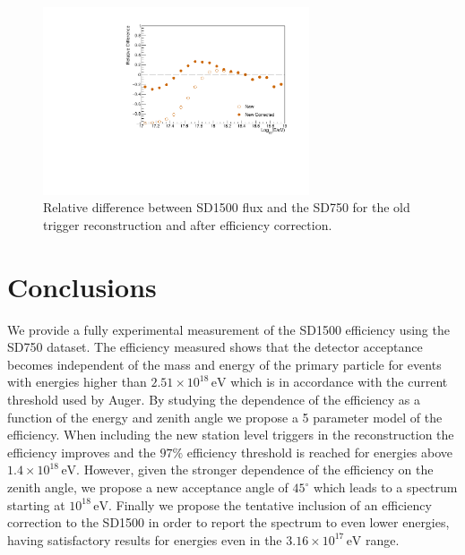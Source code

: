 \documentclass[12pt,a4paper]{article}
\newcommand{\eV}{\, \mathrm{eV}}
\begin{document}
\begin{figure}[H]
    \begin{center}
        \includegraphics[width=0.7\textwidth]{plots/NewDifference.pdf}
        \caption{Relative difference between SD1500 flux and the SD750 for the old trigger reconstruction and after efficiency correction.
        \label{fig:difference}}
        \vspace{-0.5cm}
    \end{center}
\end{figure} 

\section*{Conclusions}

We provide a fully experimental measurement of the SD1500 efficiency using the SD750 dataset. The efficiency measured shows that the detector acceptance becomes independent of the mass and energy of the primary particle for events with energies higher than $2.51\times10^{18}\eV$ which is in accordance with the current threshold used by Auger. By studying the dependence of the efficiency as a function of the energy and zenith angle we propose a 5 parameter model of the efficiency.
When including the new station level triggers in the reconstruction the efficiency improves and the $97\%$ efficiency threshold is reached for energies above $1.4\times10^{18}\eV$. However, given the stronger dependence of the efficiency on the zenith angle, we propose a new acceptance angle of $45^{\circ}$ which leads to a spectrum starting at $10^{18}\eV$.
Finally we propose the tentative inclusion of an efficiency correction to the SD1500 in order to report the spectrum to even lower energies, having satisfactory results for energies even in the $3.16\times10^{17}\eV$ range.

\pagebreak
\end{document}
